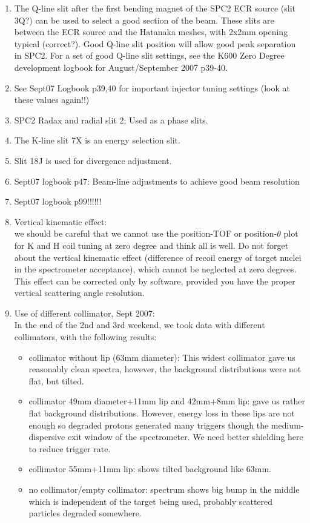 \documentclass[11pt]{report}
\begin{document}
\begin{enumerate}
\item The Q-line slit after the first bending magnet of the SPC2 ECR source (slit 3Q?)
can be used to select a good section of the beam. 
These slits are between the ECR source and the Hatanaka meshes, with 2x2mm opening typical (correct?).
Good Q-line slit position will allow good peak separation in SPC2. 
For a set of good Q-line slit settings, see the K600 Zero Degree development logbook 
for August/September 2007 p39-40.
\item See Sept07 Logbook p39,40 for important injector tuning settings (look at these values again!!)
\item SPC2 Radax and radial slit 2; Used as a phase slits.
\item The K-line slit 7X is an energy selection slit.
\item Slit 18J is used for divergence adjustment.
\item Sept07 logbook p47: Beam-line adjustments to achieve good beam resolution
\item Sept07 logbook p99!!!!!!
\item Vertical kinematic effect:\\
we should be careful that we cannot use the position-TOF or position-$\theta$ plot for 
K and H coil tuning at zero degree and think all is well. Do not forget about the vertical
kinematic effect (difference of recoil energy of target nuclei in the spectrometer acceptance),
which cannot be neglected at zero degrees.
This effect can be corrected only by software, provided you have the proper vertical scattering
angle resolution.

\item Use of different collimator, Sept 2007: \\
In the end of the 2nd and 3rd weekend, we took data with
different collimators, with the following results:
\begin{itemize}
\item collimator without lip (63mm diameter): This 
widest collimator gave us reasonably clean spectra, however, the background 
distributions were not flat, but tilted.
\item collimator 49mm diameter+11mm lip and 42mm+8mm lip: 
gave us rather flat background distributions. However, energy loss in these 
lips are not enough so degraded protons generated many triggers though the 
medium-dispersive exit window of the spectrometer. We need better shielding 
here to reduce trigger rate.
\item collimator 55mm+11mm lip: shows tilted background like 63mm.
\item no collimator/empty collimator: spectrum shows big bump in the middle which is
independent of the target being used, probably scattered particles degraded somewhere.
\end{itemize}

\end{enumerate}
\end{document}
